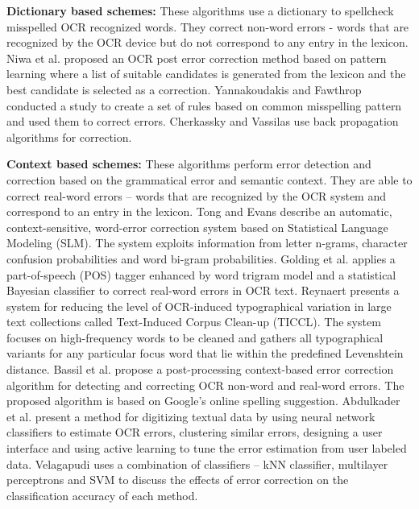 \documentclass{sig-alternate}
\begin{document}
\noindent \textbf{Dictionary based schemes: }These algorithms use a dictionary to spellcheck misspelled OCR recognized words. They correct non-word errors - words that are recognized by the OCR device but do not correspond to any entry in the lexicon. Niwa et al. \cite{postprocessing} proposed an OCR post error correction method based on pattern learning where a list of suitable candidates is generated from the lexicon and the best candidate is selected as a correction. Yannakoudakis and Fawthrop \cite{Yannakoudakis_83} conducted a study to create a set of rules based on common misspelling pattern and used them to correct errors. Cherkassky and Vassilas \cite{Cherkassky_89} use back propagation algorithms for correction. 

\noindent \textbf{Context based schemes: }These algorithms perform error detection and correction based on the grammatical error and semantic context. They are able to correct real-word errors -- words that are recognized by the OCR system and correspond to an entry in the lexicon. Tong and Evans \cite{Tong96astatistical} describe an automatic, context-sensitive, word-error correction system based on Statistical Language Modeling (SLM). The system exploits information from letter n-grams, character confusion probabilities and word bi-gram probabilities. Golding et al. \cite{contextbased} applies a part-of-speech (POS) tagger enhanced by word trigram model and a statistical Bayesian classifier to correct real-word errors in OCR text. Reynaert \cite{Reynaert2008a} presents a system for reducing the level of OCR-induced typographical variation in large text collections called Text-Induced Corpus Clean-up (TICCL). The system focuses on high-frequency words to be cleaned and gathers all typographical variants for any particular focus word that lie within the predefined Levenshtein distance. Bassil et al. \cite{Bassil_12a,Bassil_12b} propose a post-processing context-based error correction algorithm for detecting and correcting OCR non-word and real-word errors. The proposed algorithm is based on Google's online spelling suggestion. Abdulkader et al. \cite{lowcost}  present a method for digitizing textual data by using neural network classifiers to estimate OCR errors, clustering similar errors, designing a user interface and using active learning to tune the error estimation from user labeled data. 
Velagapudi \cite{velagapudi} uses a combination of classifiers -- kNN classifier,  multilayer perceptrons and SVM to discuss the effects of error correction on the classification accuracy of each method. 
\end{document}

